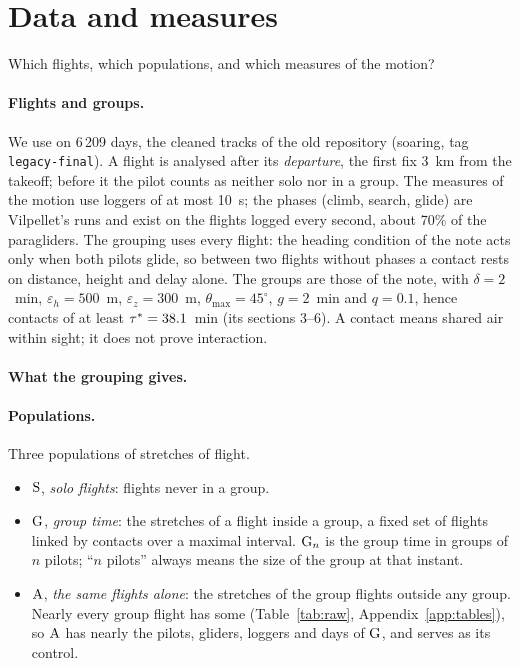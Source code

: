 \section{Data and measures}\label{sec:setup}

Which flights, which populations, and which measures of the motion?

\paragraph{Flights and groups.} We use  on 6\,209 days, the cleaned tracks
of the old repository (soaring, tag \texttt{legacy-final}). A flight is analysed after its
\emph{departure}, the first fix 3~km from the takeoff; before it the pilot counts as neither solo
nor in a group. The measures of the motion use loggers of at most 10~s; the phases (climb, search,
glide) are Vilpellet's runs and exist on the flights logged every second, about 70\% of the
paragliders. The grouping uses every flight: the heading condition of the note acts only when both
pilots glide, so between two flights without phases a contact rests on distance, height and delay
alone. The groups are those of the note, with $\delta=2$~min, $\varepsilon_h=500$~m,
$\varepsilon_z=300$~m, $\theta_{\max}=45^\circ$, $g=2$~min and $q=0.1$, hence contacts of at least
$\tau^*=38.1$~min (its sections 3--6). A contact means shared air within sight; it does not
prove interaction.

\paragraph{What the grouping gives.} 

\paragraph{Populations.} Three populations of stretches of flight.
\begin{itemize}
  \item $\mathrm{S}$, \emph{solo flights}: flights never in a group.
  \item $\mathrm{G}$, \emph{group time}: the stretches of a flight inside a group, a fixed set of flights
        linked by contacts over a maximal interval. $\mathrm{G}_n$ is the group time in groups of $n$
        pilots; ``$n$ pilots'' always means the size of the group at that instant.
  \item $\mathrm{A}$, \emph{the same flights alone}: the stretches of the group flights outside any
        group. Nearly every group flight has some (Table~\ref{tab:raw}, Appendix~\ref{app:tables}), so $\mathrm{A}$ has nearly
        the pilots, gliders, loggers and days of $\mathrm{G}$, and serves as its control.
\end{itemize}

